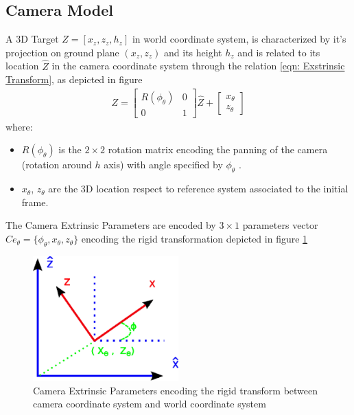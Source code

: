 \subsection{Camera Model}
A 3D Target  $Z= [x_z, z_z, h_z]$ in world coordinate system, is characterized by it's projection on ground plane $(x_z, z_z)$ and its height $h_z$ and is related to its location $\hat{Z}$ in the camera coordinate system through the relation \ref{eqn: Exstrinsic Transform}, as depicted in figure
\begin{eqnarray} \label{eqn: Exstrinsic Transform}
Z= \left[ 
\begin{array}{cc}
R(\phi_{\theta} ) & 0 \\
0 & 1
\end{array} 
\right] \hat{Z} +
\left[ 
\begin{array}{c}
x_{\theta} \\
z_{\theta}
\end{array}
\right]
\end{eqnarray}
where:
\begin{itemize}
\item $R(\phi_{\theta})$ is the $2\times2$ rotation matrix encoding the panning of the camera (rotation around $h$ axis) with angle specified by $\phi_{\theta}$ .
\item $x_{\theta}$, $z_{\theta}$ are the 3D location respect to reference system associated to the initial frame.
\end{itemize}
The Camera Extrinsic Parameters are encoded by $3\times1$ parameters vector $Ce_{\theta}=\{\phi_{\theta}, x_{\theta}, z_{\theta}\}$ encoding the rigid transformation depicted in figure \ref{fig: Estrinseci}
\begin{figure}\label{fig: Estrinseci}
\includegraphics[width=0.5\textwidth]{ImaginiLatex/Estrinseci.eps} 
\caption{ Camera Extrinsic Parameters encoding the rigid transform between camera coordinate system and world coordinate system}
\end{figure}
